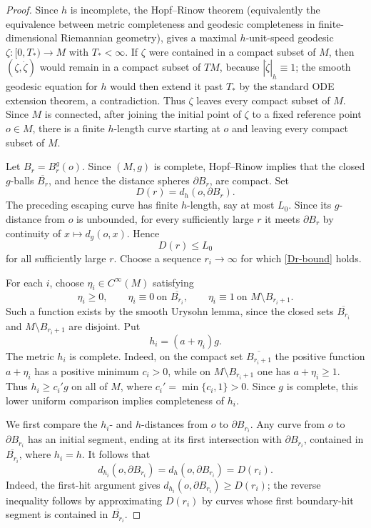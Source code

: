 \documentclass[11pt]{amsart}
\numberwithin{equation}{section}
\begin{document}
\begin{proof}
Since $h$ is incomplete, the Hopf--Rinow theorem (equivalently the equivalence between metric completeness and geodesic completeness in finite-dimensional Riemannian geometry), gives a maximal $h$-unit-speed geodesic $\zeta:[0,T_*)\to M$ with $T_*<\infty$.  If $\zeta$ were contained in a compact subset of $M$, then $(\zeta,\dot\zeta)$ would remain in a compact subset of $TM$, because $|\dot\zeta|_h\equiv1$; the smooth geodesic equation for $h$ would then extend it past $T_*$ by the standard ODE extension theorem, a contradiction.  Thus $\zeta$ leaves every compact subset of $M$.  Since $M$ is connected, after joining the initial point of $\zeta$ to a fixed reference point $o\in M$, there is a finite $h$-length curve starting at $o$ and leaving every compact subset of $M$.

Let $B_r=B_r^g(o)$.  Since $(M,g)$ is complete, Hopf--Rinow implies that the closed $g$-balls $\overline{B_r}$, and hence the distance spheres $\partial B_r$, are compact.  Set
$$
        D(r)=d_h(o,\partial B_r).
$$
The preceding escaping curve has finite $h$-length, say at most $L_0$.  Since its $g$-distance from $o$ is unbounded, for every sufficiently large $r$ it meets $\partial B_r$ by continuity of $x\mapsto d_g(o,x)$.  Hence
\begin{equation}\label{Dr-bound}
        D(r)\leq L_0
\end{equation}
for all sufficiently large $r$.  Choose a sequence $r_i\to\infty$ for which \eqref{Dr-bound} holds.

For each $i$, choose $\eta_i\in C^\infty(M)$ satisfying
$$
        \eta_i\geq0,
        \qquad
        \eta_i\equiv0\ \text{on }\overline{B_{r_i}},
        \qquad
        \eta_i\equiv1\ \text{on }M\setminus B_{r_i+1}.
$$
Such a function exists by the smooth Urysohn lemma, since the closed sets $\overline{B_{r_i}}$ and $M\setminus B_{r_i+1}$ are disjoint.  Put
$$
        h_i=(a+\eta_i)g .
$$
The metric $h_i$ is complete.  Indeed, on the compact set $\overline{B_{r_i+1}}$ the positive function $a+\eta_i$ has a positive minimum $c_i>0$, while on $M\setminus B_{r_i+1}$ one has $a+\eta_i\geq1$.  Thus $h_i\geq c_i' g$ on all of $M$, where $c_i'=\min\{c_i,1\}>0$.  Since $g$ is complete, this lower uniform comparison implies completeness of $h_i$.

We first compare the $h_i$- and $h$-distances from $o$ to $\partial B_{r_i}$.  Any curve from $o$ to $\partial B_{r_i}$ has an initial segment, ending at its first intersection with $\partial B_{r_i}$, contained in $\overline{B_{r_i}}$, where $h_i=h$.  It follows that
\begin{equation}\label{boundary-distance-equality}
        d_{h_i}(o,\partial B_{r_i})=d_h(o,\partial B_{r_i})=D(r_i).
\end{equation}
Indeed, the first-hit argument gives $d_{h_i}(o,\partial B_{r_i})\geq D(r_i)$; the reverse inequality follows by approximating $D(r_i)$ by curves whose first boundary-hit segment is contained in $\overline{B_{r_i}}$.


\end{proof}
\end{document}
